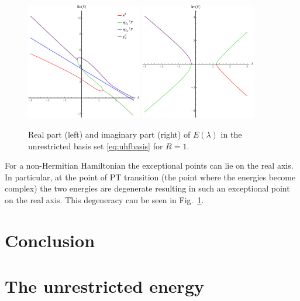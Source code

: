\documentclass[11pt,a4paper]{article}
\begin{document}
\begin{figure}[h!]
    \centering
    \includegraphics[width=0.45\textwidth]{ReNRJPT.pdf}
    \includegraphics[width=0.45\textwidth]{ImNRJPT.pdf}
    \caption{\centering Real part (left) and imaginary part (right) of $E(\lambda)$ in the unrestricted basis set \eqref{eq:uhfbasis} for $R=1$.}
    \label{fig:UHFPT}
\end{figure}

For a non-Hermitian Hamiltonian the exceptional points can lie on the real axis. In particular, at the point of PT transition (the point where the energies become complex) the two energies are degenerate resulting in such an exceptional point on the real axis. This degeneracy can be seen in Fig.~\ref{fig:UHFPT}.

\section{Conclusion}




\newpage
\printbibliography

\newpage
\appendix

\section{The unrestricted energy}\label{sec:UHF_NRJ}
\end{document}
